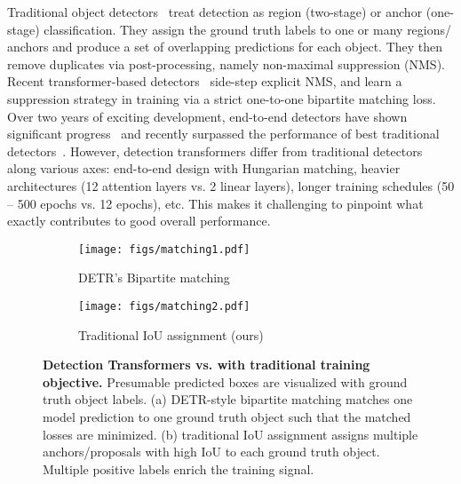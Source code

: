 \documentclass[10pt,twocolumn,letterpaper]{article}
\newcommand{\lblfig}[1]{\label{fig:#1}}
\begin{document}
Traditional object detectors~\cite{ren2015faster,lin2017focal} treat detection as region (two-stage) or anchor (one-stage) classification.
They assign the ground truth labels to one or many regions/ anchors and produce a set of overlapping predictions for each object.
They then remove duplicates via post-processing, namely non-maximal suppression (NMS).
Recent transformer-based detectors~\cite{carion2020end} side-step explicit NMS, and learn a suppression strategy in training via a strict one-to-one bipartite matching loss.
Over two years of exciting development, end-to-end detectors have shown significant progress~\cite{dai2021up,zhu2020deformable,dai2021dynamic,wang2021anchor,cheng2021maskformer,sun2020rethinking,yao2021efficient,meng2021conditional,liu2022dab,li2022dn} and recently surpassed the performance of best traditional detectors~\cite{zhang2022dino}.
However, detection transformers differ from traditional detectors along various axes: end-to-end design with Hungarian matching, heavier architectures (12 attention layers vs. 2 linear layers), longer training schedules (50 -- 500 epochs vs. 12 epochs), etc.
This makes it challenging to pinpoint what exactly contributes to good overall performance.




\begin{figure}
    \centering
    \begin{subfigure}{0.49\columnwidth}
        \texttt{[image: figs/matching1.pdf]}
        \caption{DETR's Bipartite matching}
    \end{subfigure}
    \begin{subfigure}{0.49\columnwidth}
        \texttt{[image: figs/matching2.pdf]}
        \caption{Traditional IoU assignment (ours)}
    \end{subfigure}
    \caption{{\textbf{Detection Transformers vs. with traditional training objective.}
    Presumable predicted boxes are visualized with ground truth object labels.
    (a) DETR-style bipartite matching matches one model prediction to one ground truth object such that the matched losses are minimized.
    (b) traditional IoU assignment assigns multiple anchors/proposals with high IoU to each ground truth object.
    Multiple positive labels enrich the training signal.
    }}
    \lblfig{matching}
\end{figure}
\end{document}
